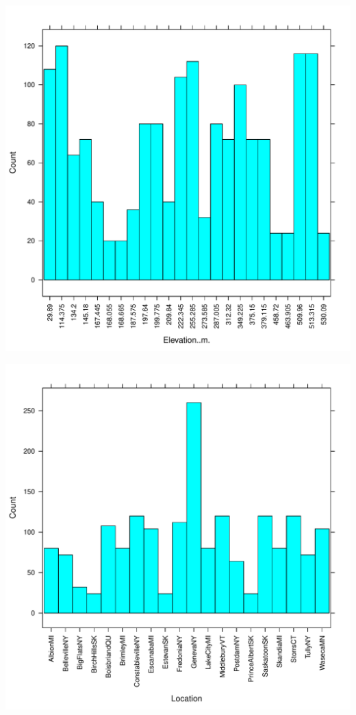 \documentclass{article}\usepackage[]{graphicx}\usepackage[]{color}
\makeatletter
\def\maxwidth{ %
  \ifdim\Gin@nat@width>\linewidth
    \linewidth
  \else
    \Gin@nat@width
  \fi
}
\newenvironment{knitrout}{}{} %
\makeatother
\begin{document}
\begin{knitrout}
{}




{\centering \includegraphics[width=\maxwidth]{figure/HistogramsDescriptorVariables-5} 

}




{\centering \includegraphics[width=\maxwidth]{figure/HistogramsDescriptorVariables-6} 

}
\end{knitrout}
\end{document}
